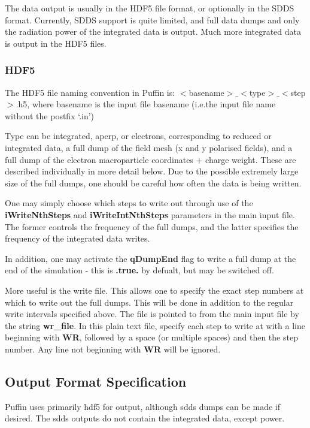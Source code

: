 \documentclass[12pt]{article}%
\begin{document}
The data output is usually in the HDF5 file format, or optionally in the SDDS format. Currently, SDDS support is quite limited, and full data dumps and only the radiation power of the integrated data is output. Much more integrated data is output in the HDF5 files.

\subsubsection{HDF5}

The HDF5 file naming convention in Puffin is: $<$basename$>\_<$type$>\_<$step$>$.h5, where basename is the input file basename (i.e.the input file name without the postfix `.in')

Type can be integrated, aperp, or electrons, corresponding to reduced or integrated data, a full dump of the field mesh (x and y polarised fields), and a full dump of the electron macroparticle coordinates $+$ charge weight. These are described individually in more detail below. Due to the possible extremely large size of the full dumps, one should be careful how often the data is being written.

One may simply choose which steps to write out through use of the {\bf iWriteNthSteps} and {\bf iWriteIntNthSteps} parameters in the main input file. The former controls the frequency of the full dumps, and the latter specifies the frequency of the integrated data writes.

In addition, one may activate the {\bf qDumpEnd} flag to write a full dump at the end of the simulation - this is {\bf .true.} by defualt, but may be switched off.

More useful is the write file. This allows one to specify the exact step numbers at which to write out the full dumps. This will be done in addition to the regular write intervals specified above. The file is pointed to from the main input file by the string {\bf wr\_file}. In this plain text file, specify each step to write at with a line beginning with {\bf WR}, followed by a space (or multiple spaces) and then the step number. Any line not beginning with {\bf WR} will be ignored.

\subsection{Output Format Specification}

Puffin uses primarily hdf5 for output, although sdds dumps can be made if desired. The sdds outputs do not contain the integrated data, except power.
\end{document}
